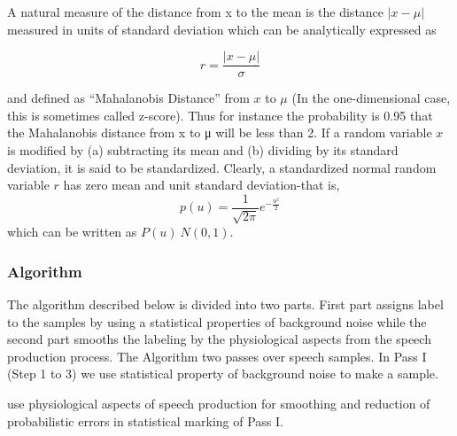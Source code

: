 \documentclass[12pt, a4paper, twoside]{report}
\begin{document}
A natural measure of the distance from x to the mean is the distance $|x - \mu |$ measured in units of standard deviation which can be analytically expressed as

\begin{equation*}
r = \frac{|x - \mu |}{\sigma}
\end{equation*}

and defined as ``Mahalanobis Distance'' from $x$ to $\mu$ (In the one-dimensional case, this is sometimes called z-score). Thus for instance the probability is 0.95 that the Mahalanobis distance from x to μ will be less than 2. If a random variable $x$ is modified by (a) subtracting its mean and (b) dividing by its standard deviation, it is said to be standardized. Clearly, a standardized normal random variable $r$ has zero mean and unit standard deviation-that is,
\begin{equation*}
p(u) = \frac{1}{\sqrt{2\pi }} e^{-\frac{u^2}{2}}
\end{equation*}
which can be written as $P(u)~N(0,1)$.

\subsubsection{Algorithm}
The algorithm described below is divided into two parts. First part assigns label to the samples by using a statistical properties of background noise while the second part smooths the labeling by the physiological aspects from the speech production process. The Algorithm two passes over speech samples. In Pass I (Step 1 to 3) we use statistical property of background noise to make a sample.
\par
use physiological aspects of speech production for smoothing and reduction of probabilistic errors in statistical marking of Pass I.
\end{document}
